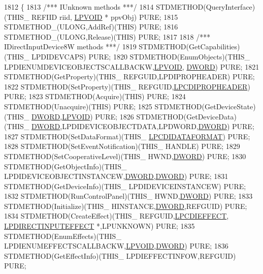 \begin{DoxyCode}
1812 \{
1813     \textcolor{comment}{/*** IUnknown methods ***/}
1814     STDMETHOD(QueryInterface)(THIS\_ REFIID riid, \hyperlink{a00003_ae611cd6871649dbfe37273a0253d5e61}{LPVOID} * ppvObj) PURE;
1815     STDMETHOD\_(ULONG,AddRef)(THIS) PURE;
1816     STDMETHOD\_(ULONG,Release)(THIS) PURE;
1817 
1818     \textcolor{comment}{/*** IDirectInputDevice8W methods ***/}
1819     STDMETHOD(GetCapabilities)(THIS\_ LPDIDEVCAPS) PURE;
1820     STDMETHOD(EnumObjects)(THIS\_ LPDIENUMDEVICEOBJECTSCALLBACKW,\hyperlink{a00003_ae611cd6871649dbfe37273a0253d5e61}{LPVOID},
      \hyperlink{a00003_a50e15ae51c87ae06ab29c8148cb5f36c}{DWORD}) PURE;
1821     STDMETHOD(GetProperty)(THIS\_ REFGUID,LPDIPROPHEADER) PURE;
1822     STDMETHOD(SetProperty)(THIS\_ REFGUID,\hyperlink{a00003_aa73246465a32c316894f99e088564911}{LPCDIPROPHEADER}) PURE;
1823     STDMETHOD(Acquire)(THIS) PURE;
1824     STDMETHOD(Unacquire)(THIS) PURE;
1825     STDMETHOD(GetDeviceState)(THIS\_ \hyperlink{a00003_a50e15ae51c87ae06ab29c8148cb5f36c}{DWORD},\hyperlink{a00003_ae611cd6871649dbfe37273a0253d5e61}{LPVOID}) PURE;
1826     STDMETHOD(GetDeviceData)(THIS\_ \hyperlink{a00003_a50e15ae51c87ae06ab29c8148cb5f36c}{DWORD},LPDIDEVICEOBJECTDATA,LPDWORD,\hyperlink{a00003_a50e15ae51c87ae06ab29c8148cb5f36c}{DWORD}) PURE;
1827     STDMETHOD(SetDataFormat)(THIS\_ \hyperlink{a00003_ab7e0c3254f09795a4a2176cac228ba7d}{LPCDIDATAFORMAT}) PURE;
1828     STDMETHOD(SetEventNotification)(THIS\_ HANDLE) PURE;
1829     STDMETHOD(SetCooperativeLevel)(THIS\_ HWND,\hyperlink{a00003_a50e15ae51c87ae06ab29c8148cb5f36c}{DWORD}) PURE;
1830     STDMETHOD(GetObjectInfo)(THIS\_ LPDIDEVICEOBJECTINSTANCEW,\hyperlink{a00003_a50e15ae51c87ae06ab29c8148cb5f36c}{DWORD},\hyperlink{a00003_a50e15ae51c87ae06ab29c8148cb5f36c}{DWORD}) PURE;
1831     STDMETHOD(GetDeviceInfo)(THIS\_ LPDIDEVICEINSTANCEW) PURE;
1832     STDMETHOD(RunControlPanel)(THIS\_ HWND,\hyperlink{a00003_a50e15ae51c87ae06ab29c8148cb5f36c}{DWORD}) PURE;
1833     STDMETHOD(Initialize)(THIS\_ HINSTANCE,\hyperlink{a00003_a50e15ae51c87ae06ab29c8148cb5f36c}{DWORD},REFGUID) PURE;
1834     STDMETHOD(CreateEffect)(THIS\_ REFGUID,\hyperlink{a00003_a7913240b16286bfdcb811a35a982b236}{LPCDIEFFECT},
      \hyperlink{a00003_ac8278f319038d7db709c5ea828830fb9}{LPDIRECTINPUTEFFECT} *,LPUNKNOWN) PURE;
1835     STDMETHOD(EnumEffects)(THIS\_ LPDIENUMEFFECTSCALLBACKW,\hyperlink{a00003_ae611cd6871649dbfe37273a0253d5e61}{LPVOID},\hyperlink{a00003_a50e15ae51c87ae06ab29c8148cb5f36c}{DWORD}) PURE;
1836     STDMETHOD(GetEffectInfo)(THIS\_ LPDIEFFECTINFOW,REFGUID) PURE;

\end{DoxyCode}
